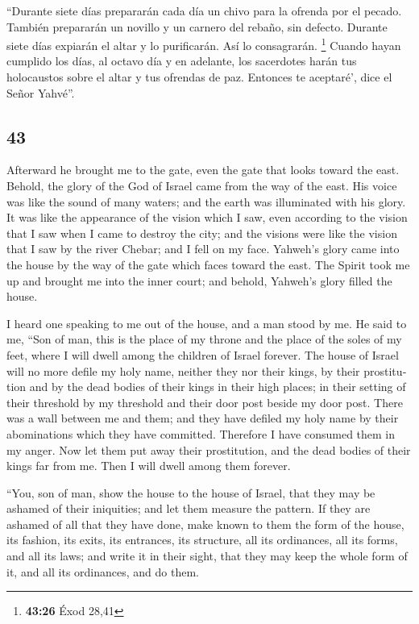 \begin{paracol}{2}
 ``Durante siete días prepararán cada día un chivo para
la ofrenda por el pecado. También prepararán un novillo y un carnero del
rebaño, sin defecto.  Durante siete días expiarán el
altar y lo purificarán. Así lo consagrarán. \footnote{\textbf{43:26}
  Éxod 28,41}  Cuando hayan cumplido los días, al octavo
día y en adelante, los sacerdotes harán tus holocaustos sobre el altar y
tus ofrendas de paz. Entonces te aceptaré', dice el Señor Yahvé''.

\switchcolumn
\begin{otherlanguage}{english}

\hypertarget{section-85}{%
\section{43}\label{section-85}}

 Afterward he brought me to the gate, even the gate that
looks toward the east.  Behold, the glory of the God of
Israel came from the way of the east. His voice was like the sound of
many waters; and the earth was illuminated with his glory.
 It was like the appearance of the vision which I saw,
even according to the vision that I saw when I came to destroy the city;
and the visions were like the vision that I saw by the river Chebar; and
I fell on my face.  Yahweh's glory came into the house by
the way of the gate which faces toward the east.  The
Spirit took me up and brought me into the inner court; and behold,
Yahweh's glory filled the house.

 I heard one speaking to me out of the house, and a man
stood by me.  He said to me, ``Son of man, this is the
place of my throne and the place of the soles of my feet, where I will
dwell among the children of Israel forever. The house of Israel will no
more defile my holy name, neither they nor their kings, by their
prostitution and by the dead bodies of their kings in their high places;
 in their setting of their threshold by my threshold and
their door post beside my door post. There was a wall between me and
them; and they have defiled my holy name by their abominations which
they have committed. Therefore I have consumed them in my anger.
 Now let them put away their prostitution, and the dead
bodies of their kings far from me. Then I will dwell among them forever.

 ``You, son of man, show the house to the house of
Israel, that they may be ashamed of their iniquities; and let them
measure the pattern.  If they are ashamed of all that
they have done, make known to them the form of the house, its fashion,
its exits, its entrances, its structure, all its ordinances, all its
forms, and all its laws; and write it in their sight, that they may keep
the whole form of it, and all its ordinances, and do them.


\end{otherlanguage}
\end{paracol}
